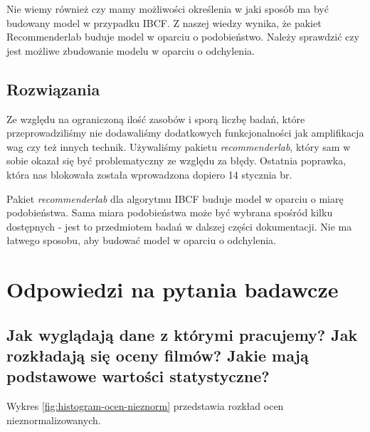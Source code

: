 \documentclass[12pt, a4paper]{article}
\begin{document}
Nie wiemy również czy mamy możliwości określenia w jaki sposób ma być budowany model w przypadku IBCF. Z naszej wiedzy wynika, że pakiet Recommenderlab buduje model w oparciu o podobieństwo. Należy sprawdzić czy jest możliwe zbudowanie modelu w oparciu o odchylenia.

\subsection{Rozwiązania}
Ze względu na ograniczoną ilość zasobów i sporą liczbę badań, które przeprowadziliśmy nie dodawaliśmy dodatkowych funkcjonalności jak amplifikacja wag czy też innych technik. Używaliśmy pakietu \emph{recommenderlab}, który sam w sobie okazał się być problematyczny ze względu za błędy. Ostatnia poprawka, która nas blokowała została wprowadzona dopiero 14 stycznia br. 

Pakiet \emph{recommenderlab} dla algorytmu IBCF buduje model w oparciu o miarę podobieństwa. Sama miara podobieństwa może być wybrana spośród kilku dostępnych - jest to przedmiotem badań w dalszej części dokumentacji. Nie ma łatwego sposobu, aby budować model w oparciu o odchylenia.

\section{Odpowiedzi na pytania badawcze}
\subsection{Jak wyglądają dane z którymi pracujemy? Jak rozkładają się oceny filmów? Jakie mają podstawowe wartości statystyczne?}
Wykres \ref{fig:histogram-ocen-nieznorm} przedstawia rozkład ocen nieznormalizowanych. 
\end{document}
